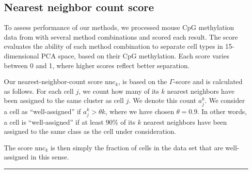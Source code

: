 \documentclass[twocolumn,10pt]{article}
\begin{document}
\subsection{Nearest neighbor count score}
To assess performance of our methods, we processed mouse CpG methylation data from \citet{luo2017single} with several method combinations and scored each result. The score evaluates the ability of each method combination to separate cell types in 15-dimensional PCA space, based on their CpG methylation. Each score varies between 0 and 1, where higher scores reflect better separation.

Our nearest-neighbor-count score $\text{nnc}_k$, is based on the $\Gamma$-score \citep{Kireeva_2014} and is calculated as follows. For each cell $j$, we count how many of its $k$ nearest neighbors have been assigned to the same cluster as cell $j$. We denote this count $a^k_j$. We consider a cell as ``well-assigned'' if $a^k_j>\theta k$, where we have chosen $\theta=0.9$. In other words, a cell is ``well-assigned'' if at least 90\% of its $k$ nearest neighbors have been assigned to the same class as the cell under consideration.

The score $\text{nnc}_k$ is then simply the fraction of cells in the data set that are well-assigned in this sense.

\vspace{1.4ex}
\noindent\hfil\rule{.6\columnwidth}{.2pt}\hfil


{\small }
\end{document}

